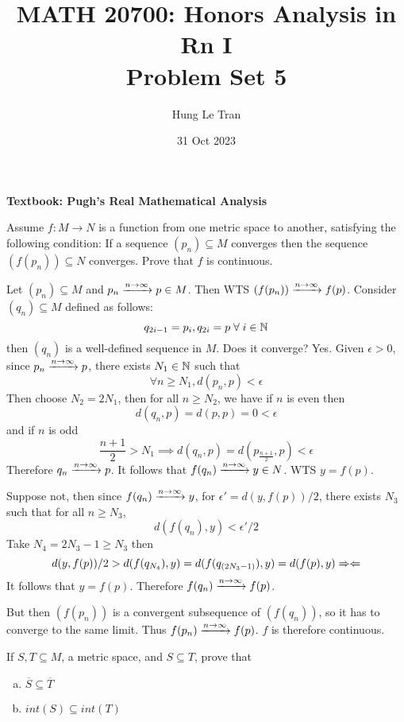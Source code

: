 \documentclass[a4paper, 12pt]{article}
\title{MATH 20700: Honors Analysis in Rn I \\ \large Problem Set 5}
\date{31 Oct 2023}
\author{Hung Le Tran}
\begin{document}
\maketitle
\setcounter{section}{5}
\textbf{Textbook: Pugh's Real Mathematical Analysis}
\begin{problem} 
Assume $f: M \to N$  is a function from one metric space to another, satisfying the following condition: If a sequence $(p_n) \subseteq M$ converges then the sequence $(f(p_n)) \subseteq N$ converges. Prove that $f$ is continuous.
\end{problem}
\begin{solution}
    Let $(p_n) \subseteq M$ and $p_n \xrightarrow{n \to \infty} p \in M$. Then WTS $(f(p_n)) \xrightarrow{n \to \infty} f(p)$. Consider $(q_n) \subseteq M$ defined as follows: \[
        q_{2i -1} = p_i, q_{2i} = p \forall i \in \bbn
    \]
    then $(q_n)$ is a well-defined sequence in $M$. Does it converge? Yes. Given $\epsilon > 0$, since $p_n \xrightarrow{n \to \infty} p$, there exists $N_1 \in \mathbb{N} $ such that \[
        \forall n \geq N_1, d(p_n, p) < \epsilon
    \]
    Then choose $N_2 = 2N_1$, then for all $n \geq N_2$, we have if $n$ is even then \[
        d(q_n, p) = d(p, p) = 0 < \epsilon
    \]
    and if $n$ is odd \[
        \frac{n+ 1}{2} > N_1 \implies d(q_n, p) = d(p_{\frac{n+1}{2}}, p) < \epsilon
    \]
    Therefore $q_n \xrightarrow{n \to \infty} p$. It follows that $f(q_n) \xrightarrow{n \to \infty} y \in N$. WTS $y = f(p)$.

    Suppose not, then since $f(q_n) \xrightarrow{n \to \infty} y$, for $\epsilon' = d(y, f(p))/2$, there exists $N_3$ such that for all $n \geq N_3$, \[
        d(f(q_n),  y) < \epsilon' / 2
    \]
    Take $N_4 = 2N_3 - 1 \geq N_3$ then \[
        d(y, f(p))/2 > d(f(q_{N_4}), y) = d(f(q_{(2N_3 - 1)}), y) = d(f(p), y) \Rightarrow\Leftarrow
    \]
    It follows that $y = f(p)$. Therefore $f(q_n) \xrightarrow{n \to \infty} f(p)$.

    But then $(f(p_n))$ is a convergent subsequence of $(f(q_n))$, so it has to converge to the same limit. Thus $f(p_n) \xrightarrow{n \to \infty} f(p)$. $f$ is therefore continuous.
\end{solution}
\begin{problem} 
If $S, T \subseteq M$, a metric space, and $S \subseteq T$, prove that \begin{enumerate} [(a)]
    \item $\overline{S} \subseteq \overline{T}$
    \item $int(S) \subseteq int(T)$
\end{enumerate}
\end{problem}
\end{document}
